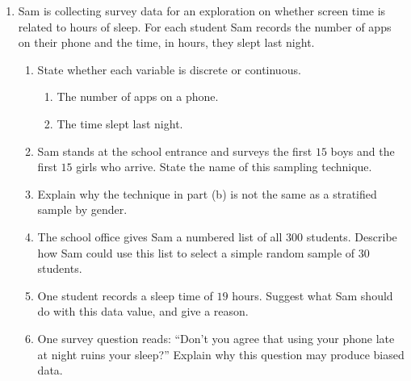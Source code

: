 \documentclass[12pt, twoside]{article}
\begin{document}
\begin{enumerate}[itemsep=0.15cm]

\newpage

\item[2.]

Sam is collecting survey data for an exploration on whether screen time
is related to hours of sleep. For each student Sam records the number of
apps on their phone and the time, in hours, they slept last night.

\begin{enumerate}[itemsep=0.1cm]
  \item State whether each variable is discrete or continuous.
  \begin{enumerate}[label=(\roman*)]
    \item The number of apps on a phone.
    \item The time slept last night.
  \end{enumerate}
  \item Sam stands at the school entrance and surveys the first $15$
  boys and the first $15$ girls who arrive. State the name of this
  sampling technique.
  \item Explain why the technique in part (b) is not the same as a
  stratified sample by gender.
  \item The school office gives Sam a numbered list of all $300$
  students. Describe how Sam could use this list to select a simple
  random sample of $30$ students.
  \item One student records a sleep time of $19$ hours. Suggest what
  Sam should do with this data value, and give a reason.
  \item One survey question reads: ``Don't you agree that using your
  phone late at night ruins your sleep?'' Explain why this question
  may produce biased data.
\end{enumerate}


\end{enumerate}
\end{document}
